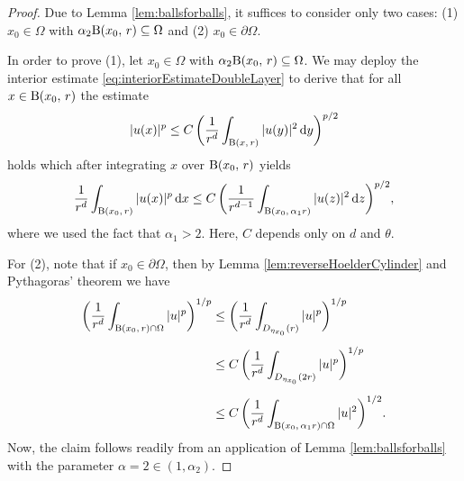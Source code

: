 \begin{proof}

  Due to Lemma \ref{lem:ballsforballs}, it suffices to consider only two cases: (1) $x_0 \in \Omega$ with $\alpha_2 \mathrm{B}(x_0,\,r) \subseteq \Omega$ and (2) $x_0 \in \partial\Omega$.

  In order to prove (1), let $x_0 \in \Omega$ with $\alpha_2 \mathrm{B}(x_0,\,r) \subseteq \Omega$. We may deploy the interior estimate \eqref{eq:interiorEstimateDoubleLayer} to derive that for all $x \in \mathrm{B}(x_0,\,r)$ the estimate
  \begin{align*}
    |u(x)|^p \leq C\, \bigg( \frac{1}{r^{d}} \int_{\mathrm{B}(x,\,r)} |u(y)|^2 \, {\operatorname{d}\!{y}} \bigg)^{p/2}
  \end{align*}
  holds which after integrating $x$ over $\mathrm{B}(x_0,\, r)$ yields
  \begin{align*}
    \frac{1}{r^{d}}\int_{\mathrm{B}(x_0,\, r)} |u(x)|^p \, {\operatorname{d}\!{x}} \leq C\, \bigg(  \frac{1}{r^{d-1}}\int_{\mathrm{B}(x_0,\, \alpha_1 r)} |u(z)|^2 \, {\operatorname{d}\!{z}} \bigg)^{p/2},
  \end{align*}
  where we used the fact that $\alpha_1 > 2$. 
  Here, $C$ depends only on $d$ and $\theta$.

  For (2), note that if $x_0 \in \partial\Omega$, then by Lemma \ref{lem:reverseHoelderCylinder} and Pythagoras' theorem we have
  \begin{align*}
    \bigg( \frac{1}{r^d} \int_{\mathrm{B}(x_0,\, r) \cap \Omega} |u|^p \bigg)^{1/p}
    &\leq \bigg( \frac{1}{r^d} \int_{D_{\eta_{x_0}}(r)} |u|^p \bigg)^{1/p} \\[0.5em]
    &\leq C \, \bigg( \frac{1}{r^d} \int_{D_{\eta_{x_0}}(2 r)} |u|^p \bigg)^{1/p} \\[0.5em]
    &\leq C \, \bigg( \frac{1}{r^d} \int_{\mathrm{B}(x_0,\, \alpha_1 r) \cap \Omega} |u|^2 \bigg)^{1/2}.
  \end{align*}
  Now, the claim follows readily from an application of Lemma \ref{lem:ballsforballs} with the parameter $\alpha = 2 \in (1, \alpha_2)$.
\end{proof}

